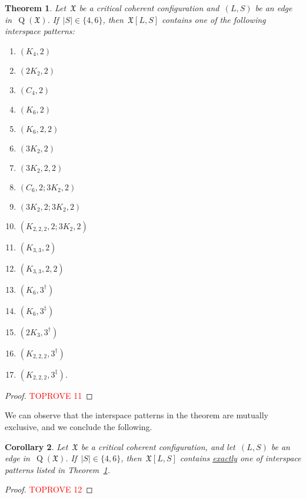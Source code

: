 \documentclass[english,a4paper]{article}
\theoremstyle{plain}
\newtheorem{theorem}             {Theorem}[section]
\newtheorem{corollary}  [theorem]{Corollary}
\theoremstyle{definition}
\newcommand{\abs}[1]{| #1 |}
\newcommand{\coherentConfig}{\ensuremath{\mathfrak{X}}}
\newcommand{\interspace}[2]{\ensuremath{\coherentConfig[#1,#2]}}
\DeclareMathOperator*{\Quotient}{Q}
\newcommand{\quotientGraph}[1]{\ensuremath{\Quotient(#1)}}
\newcommand{\ipfourClique}  {\ensuremath{(\clique{4},2)}}
\newcommand{\ipfourMatching}{\ensuremath{(\disjointCliques{2}{2},2)}}
\newcommand{\ipfourCycle}   {\ensuremath{(\cycle{4},2)}}
\newcommand{\ipsixCliqueTwo}     {\ensuremath{(\clique{6},2)}}
\newcommand{\ipsixCliqueTwoTwice}{\ensuremath{(\clique{6},2,2)}}
\newcommand{\ipsixCliqueThree}   {\ensuremath{(\clique{6},3^\dag)}}
\newcommand{\ipsixCliqueThreeD}	 {\ensuremath{(\clique{6},3^\ddag)}}
\newcommand{\ipsixMatching}             {\ensuremath{(\disjointCliques{3}{2},2)}}
\newcommand{\ipsixMatchingTwice}        {\ensuremath{(\disjointCliques{3}{2},2,2)}}
\newcommand{\ipsixMatchingMatching}     {\ensuremath{(\disjointCliques{3}{2},2;\disjointCliques{3}{2},2)}}
\newcommand{\ipsixMatchingAndCycle}     {\ensuremath{(\cycle{6},2;\disjointCliques{3}{2},2)}}
\newcommand{\ipsixMatchingAndComplement}{\ensuremath{(\clique{2,2,2},2;\disjointCliques{3}{2},2)}}
\newcommand{\ipsixTriangle}               {\ensuremath{(\disjointCliques{2}{3},3^\dag)}}
\newcommand{\ipsixTriangleComplement}     {\ensuremath{(\clique{3,3},2)}}
\newcommand{\ipsixTriangleComplementTwice}{\ensuremath{(\clique{3,3},2,2)}}
\newcommand{\ipsixMatchingComplement} {\ensuremath{(\clique{2,2,2},3^\dag)}}
\newcommand{\ipsixMatchingComplementD}{\ensuremath{(\clique{2,2,2},3^\ddag)}}
\newcommand{\clique}[1]{\ensuremath{K_{#1}}}
\newcommand{\cycle}[1]{\ensuremath{C_{#1}}}
\newcommand{\disjointCliques}[2]{\ensuremath{#1 \clique{#2}}}
\begin{document}
\begin{theorem}
\label{global-argument:large-small-interspace:classification}
    Let~$\coherentConfig$ be a critical coherent configuration and~$(L,S)$ be an edge in~$\quotientGraph{\coherentConfig}$.
    If~$\abs{S} \in \{4,6\}$, then~$\interspace{L}{S}$ contains one of the following interspace patterns:
    \begin{multicols}{4}
        \begin{enumerate}
            \item \ipfourClique
            \item \ipfourMatching
            \item \ipfourCycle
            \item \ipsixCliqueTwo
            \item \ipsixCliqueTwoTwice
            \item \ipsixMatching
            \item \ipsixMatchingTwice
            \item \ipsixMatchingAndCycle
            \item \ipsixMatchingMatching
            \item \ipsixMatchingAndComplement
            \item \ipsixTriangleComplement
            \item \ipsixTriangleComplementTwice
            \item \ipsixCliqueThree
            \item \ipsixCliqueThreeD
            \item \ipsixTriangle
            \item \ipsixMatchingComplement
            \item \ipsixMatchingComplementD.
        \end{enumerate}
    \end{multicols}
\end{theorem}
\begin{proof}\textcolor{red}{TOPROVE 11}\end{proof}


We can observe that the interspace patterns in the theorem are mutually exclusive, and we conclude the following.


\begin{corollary}
\label{large-small-interspace:classification:uniqueness/cor}
    Let~$\coherentConfig$ be a critical coherent configuration, and let~$(L,S)$ be an edge in~$\quotientGraph{\coherentConfig}$.
    If~$\abs{S} \in \{4,6\}$, then~$\interspace{L}{S}$ contains \underline{exactly} one of interspace patterns listed in Theorem~\ref{global-argument:large-small-interspace:classification}.
\end{corollary}
\begin{proof}\textcolor{red}{TOPROVE 12}\end{proof}
\end{document}
